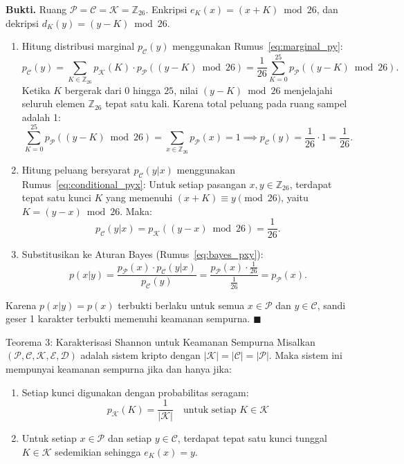 \documentclass[11pt,a4paper]{article}
\newenvironment{proof}{\noindent\textbf{Bukti.}}{\hfill$\blacksquare$\vspace{0.3em}}
\begin{document}
\begin{proof}
Ruang $\mathcal{P} = \mathcal{C} = \mathcal{K} = \mathbb{Z}_{26}$. Enkripsi $e_K(x) = (x + K) \bmod 26$, dan dekripsi $d_K(y) = (y - K) \bmod 26$.
\begin{enumerate}
    \item Hitung distribusi marginal $p_{\mathcal{C}}(y)$ menggunakan Rumus~\eqref{eq:marginal_py}:
    \[
    p_{\mathcal{C}}(y) = \sum_{K \in \mathbb{Z}_{26}} p_{\mathcal{K}}(K) \cdot p_{\mathcal{P}}((y - K) \bmod 26) = \frac{1}{26} \sum_{K=0}^{25} p_{\mathcal{P}}((y - K) \bmod 26).
    \]
    Ketika $K$ bergerak dari $0$ hingga $25$, nilai $(y - K) \bmod 26$ menjelajahi seluruh elemen $\mathbb{Z}_{26}$ tepat satu kali. Karena total peluang pada ruang sampel adalah 1:
    \[
    \sum_{K=0}^{25} p_{\mathcal{P}}((y - K) \bmod 26) = \sum_{x \in \mathbb{Z}_{26}} p_{\mathcal{P}}(x) = 1 \implies p_{\mathcal{C}}(y) = \frac{1}{26} \cdot 1 = \frac{1}{26}.
    \]
    \item Hitung peluang bersyarat $p_{\mathcal{C}}(y|x)$ menggunakan Rumus~\eqref{eq:conditional_pyx}:
    Untuk setiap pasangan $x, y \in \mathbb{Z}_{26}$, terdapat tepat satu kunci $K$ yang memenuhi $(x + K) \equiv y \pmod{26}$, yaitu $K = (y - x) \bmod 26$. Maka:
    \[
    p_{\mathcal{C}}(y|x) = p_{\mathcal{K}}((y - x) \bmod 26) = \frac{1}{26}.
    \]
    \item Substitusikan ke Aturan Bayes (Rumus~\eqref{eq:bayes_pxy}):
    \[
    p(x|y) = \frac{p_{\mathcal{P}}(x) \cdot p_{\mathcal{C}}(y|x)}{p_{\mathcal{C}}(y)} = \frac{p_{\mathcal{P}}(x) \cdot \frac{1}{26}}{\frac{1}{26}} = p_{\mathcal{P}}(x).
    \]
\end{enumerate}
Karena $p(x|y) = p(x)$ terbukti berlaku untuk semua $x \in \mathcal{P}$ dan $y \in \mathcal{C}$, sandi geser 1 karakter terbukti memenuhi keamanan sempurna.
\end{proof}

\begin{thmbox}{Teorema 3: Karakterisasi Shannon untuk Keamanan Sempurna}
Misalkan $(\mathcal{P}, \mathcal{C}, \mathcal{K}, \mathcal{E}, \mathcal{D})$ adalah sistem kripto dengan $|\mathcal{K}| = |\mathcal{C}| = |\mathcal{P}|$. Maka sistem ini mempunyai keamanan sempurna jika dan hanya jika:
\begin{enumerate}
    \item Setiap kunci digunakan dengan probabilitas seragam:
    \begin{equation}
    \label{eq:shannon_uniform}
    p_{\mathcal{K}}(K) = \frac{1}{|\mathcal{K}|} \quad \text{untuk setiap } K \in \mathcal{K}
    \end{equation}
    \item Untuk setiap $x \in \mathcal{P}$ dan setiap $y \in \mathcal{C}$, terdapat tepat satu kunci tunggal $K \in \mathcal{K}$ sedemikian sehingga $e_K(x) = y$.
\end{enumerate}
\end{thmbox}
\end{document}
